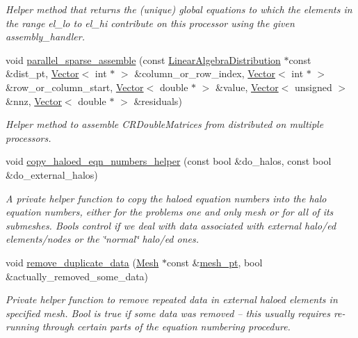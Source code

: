 \begin{DoxyCompactItemize}
\begin{DoxyCompactList}\small\item\em Helper method that returns the (unique) global equations to which the elements in the range el\+\_\+lo to el\+\_\+hi contribute on this processor using the given assembly\+\_\+handler. \end{DoxyCompactList}\item 
void \hyperlink{classoomph_1_1Problem_a0487a7ef40e6cc4dad88e99ac96193e2}{parallel\+\_\+sparse\+\_\+assemble} (const \hyperlink{classoomph_1_1LinearAlgebraDistribution}{Linear\+Algebra\+Distribution} $\ast$const \&dist\+\_\+pt, \hyperlink{classoomph_1_1Vector}{Vector}$<$ int $\ast$ $>$ \&column\+\_\+or\+\_\+row\+\_\+index, \hyperlink{classoomph_1_1Vector}{Vector}$<$ int $\ast$ $>$ \&row\+\_\+or\+\_\+column\+\_\+start, \hyperlink{classoomph_1_1Vector}{Vector}$<$ double $\ast$ $>$ \&value, \hyperlink{classoomph_1_1Vector}{Vector}$<$ unsigned $>$ \&nnz, \hyperlink{classoomph_1_1Vector}{Vector}$<$ double $\ast$ $>$ \&residuals)
\begin{DoxyCompactList}\small\item\em Helper method to assemble C\+R\+Double\+Matrices from distributed on multiple processors. \end{DoxyCompactList}\item 
void \hyperlink{classoomph_1_1Problem_a3d06660ec06b402f14d4b33a84621214}{copy\+\_\+haloed\+\_\+eqn\+\_\+numbers\+\_\+helper} (const bool \&do\+\_\+halos, const bool \&do\+\_\+external\+\_\+halos)
\begin{DoxyCompactList}\small\item\em A private helper function to copy the haloed equation numbers into the halo equation numbers, either for the problem\textquotesingle{}s one and only mesh or for all of its submeshes. Bools control if we deal with data associated with external halo/ed elements/nodes or the \char`\"{}normal\char`\"{} halo/ed ones. \end{DoxyCompactList}\item 
void \hyperlink{classoomph_1_1Problem_a088570d2600c2e710da2717e9ed35404}{remove\+\_\+duplicate\+\_\+data} (\hyperlink{classoomph_1_1Mesh}{Mesh} $\ast$const \&\hyperlink{classoomph_1_1Problem_aad122d70a22dc5302cfd5853d3cf3057}{mesh\+\_\+pt}, bool \&actually\+\_\+removed\+\_\+some\+\_\+data)
\begin{DoxyCompactList}\small\item\em Private helper function to remove repeated data in external haloed elements in specified mesh. Bool is true if some data was removed -- this usually requires re-\/running through certain parts of the equation numbering procedure. \end{DoxyCompactList}\item 

\end{DoxyCompactItemize}
